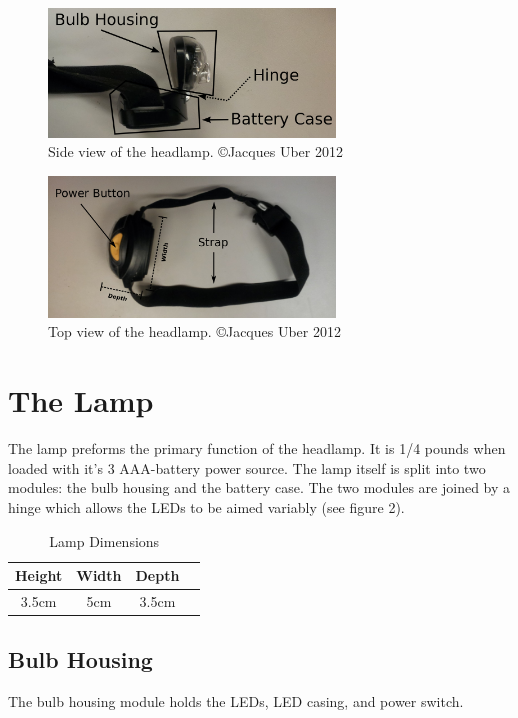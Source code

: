 \documentclass[12pt]{article}
\begin{document}
\begin{figure}[h!]
\centering
\caption[Side view of the headlamp] {Side view of the headlamp. \copyright Jacques Uber 2012}
\includegraphics[width=3in]{headlamp_side}
\end{figure}

\begin{figure}[h!]
\centering
\caption[Top view of the headlamp] {Top view of the headlamp. \copyright Jacques Uber 2012}
\includegraphics[width=3in]{headlamp_top}
\end{figure}

\section{The Lamp}
The lamp preforms the primary function of the headlamp. It is 1/4 pounds when loaded with
it's 3 AAA-battery power source. The lamp itself is split into two modules: the bulb housing and the
battery case. The two modules are joined by a hinge which allows the LEDs to be aimed variably (see
figure 2).

\begin{table}
\begin{center}
\begin{tabular}{ | c | c | c | p{5cm} |}
    \hline
    Height & Width & Depth \\ \hline
    3.5cm & 5cm & 3.5cm  \\ \hline
\end{tabular}
\end{center}
\caption{Lamp Dimensions}
\end{table}

\subsection{Bulb Housing}
The bulb housing module holds the LEDs, LED casing, and power switch.
\end{document}
